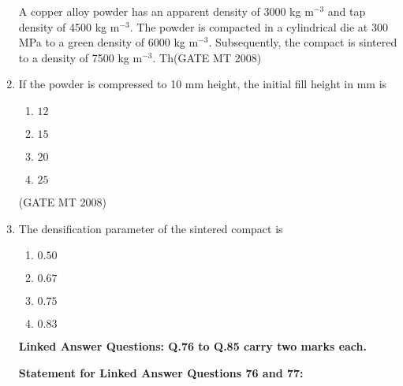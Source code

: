 \documentclass[11pt, letterpaper]{article}
\theoremstyle{remark}
\begin{document}
\begin{enumerate}[label=Q.\arabic*]
    A copper alloy powder has an apparent density of 3000 kg m$^{-3}$ and tap density of 4500 kg m$^{-3}$. 
    The powder is compacted in a cylindrical die at 300 MPa to a green density of 6000 kg m$^{-3}$. 
    Subsequently, the compact is sintered to a density of 7500 kg m$^{-3}$. 
    Th(GATE MT 2008)
    \item If the powder is compressed to 10 mm height, the initial fill height in mm is
    \begin{multicols}{4}
        \begin{enumerate}[label=(\MakeUppercase{\alph*})]
            \item $12$
            \item $15$
            \item $20$
            \item $25$
        \end{enumerate}
    \end{multicols}
\hfill(GATE MT 2008)
    \item The densification parameter of the sintered compact is
    \begin{multicols}{4}
        \begin{enumerate}[label=(\MakeUppercase{\alph*})]
            \item $0.50$
            \item $0.67$
            \item $0.75$
            \item $0.83$
        \end{enumerate}
    \end{multicols}

    \vspace{0.5em}
    \textbf{Linked Answer Questions: Q.76 to Q.85 carry two marks each.}

    \textbf{Statement for Linked Answer Questions 76 and 77:}


\end{enumerate}
\end{document}
